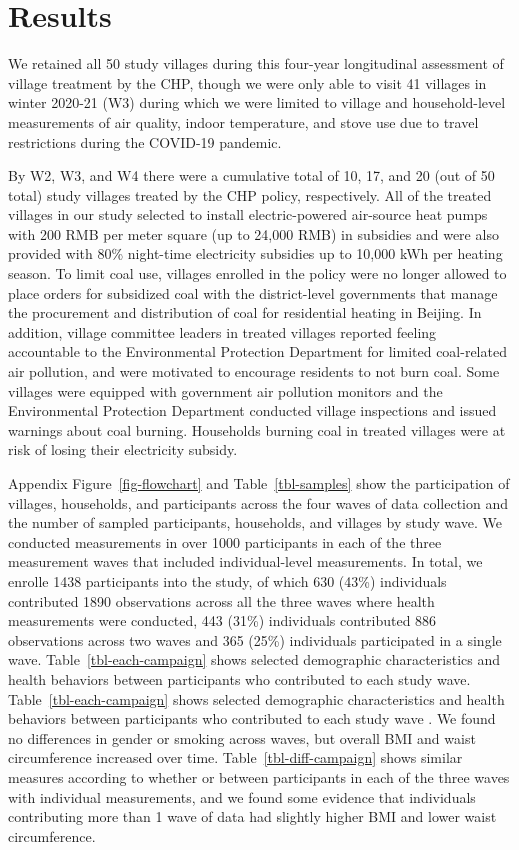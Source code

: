 \documentclass[
  letterpaper,
  DIV=11,
  numbers=noendperiod]{scrartcl}
\begin{document}
\section{Results}\label{results-1}

We retained all 50 study villages during this four-year longitudinal
assessment of village treatment by the CHP, though we were only able to
visit 41 villages in winter 2020-21 (W3) during which we were limited to
village and household-level measurements of air quality, indoor
temperature, and stove use due to travel restrictions during the
COVID-19 pandemic.

By W2, W3, and W4 there were a cumulative total of 10, 17, and 20 (out
of 50 total) study villages treated by the CHP policy, respectively. All
of the treated villages in our study selected to install
electric-powered air-source heat pumps with 200 RMB per meter square (up
to 24,000 RMB) in subsidies and were also provided with 80\% night-time
electricity subsidies up to 10,000 kWh per heating season. To limit coal
use, villages enrolled in the policy were no longer allowed to place
orders for subsidized coal with the district-level governments that
manage the procurement and distribution of coal for residential heating
in Beijing. In addition, village committee leaders in treated villages
reported feeling accountable to the Environmental Protection Department
for limited coal-related air pollution, and were motivated to encourage
residents to not burn coal. Some villages were equipped with government
air pollution monitors and the Environmental Protection Department
conducted village inspections and issued warnings about coal burning.
Households burning coal in treated villages were at risk of losing their
electricity subsidy.

Appendix  Figure~\ref{fig-flowchart} and
Table~\ref{tbl-samples} show the participation of villages, households,
and participants across the four waves of data collection and the number
of sampled participants, households, and villages by study wave. We
conducted measurements in over 1000 participants in each of the three
measurement waves that included individual-level measurements. In total,
we enrolle  1438 participants into the study, of which
630 (43\%) individuals contributed 1890 observations across all the
three waves where health measurements were conducted, 443 (31\%)
individuals contributed 886 observations across two waves and 365 (25\%)
individuals participated in a single wave. Table~\ref{tbl-each-campaign}
shows selected demographic characteristics and health behaviors between
participants who contributed to each study wave.
Table~\ref{tbl-each-campaign} shows selected demographic characteristics
and health behaviors between participants who contributed to each study
wave . We found no differences in gender or smoking
across waves, but overall BMI and waist circumference increased over
time. Table~\ref{tbl-diff-campaign} shows similar
measures according to whether or between participants in each of the
three waves with individual measurements, and we found some evidence
that individuals contributing more than 1 wave of data had slightly
higher BMI and lower waist circumference.
\end{document}
